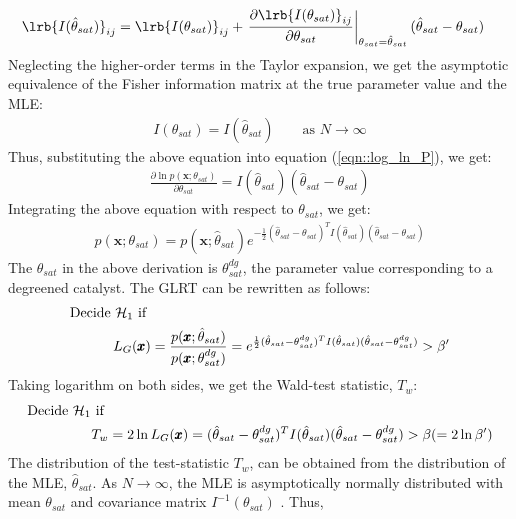 \begin{align}
        \lrb{I(\hat \theta_{sat})}_{ij} &=  \lrb{I(\theta_{sat})}_{ij} + \left. \frac{\partial \lrb{I(\theta_{sat})}_{ij}}{\partial \theta_{sat}} \right|_{\theta_{sat} = \hat \theta_{sat}} (\hat \theta_{sat} - \theta_{sat})
        \label{eqn::I_taylor}
\end{align}
Neglecting the higher-order terms in the Taylor expansion, we get the asymptotic equivalence of the Fisher information matrix at the true parameter value and the MLE:
\begin{align}
        I(\theta_{sat}) = I(\hat \theta_{sat}) \qquad \text{as } N \rightarrow \infty
        \label{eqn::I_asymp}
\end{align}
Thus, substituting the above equation into equation (\ref{eqn::log_ln_P}), we get:
\begin{align}
        \frac{\partial \ln p(\pmb x; \theta_{sat})}{\partial \theta_{sat}} = I(\hat \theta_{sat})(\hat \theta_{sat} - \theta_{sat})
        \label{eqn::log_ln_P_2}
\end{align}
Integrating the above equation with respect to $\theta_{sat}$, we get:
\begin{align}
        p(\pmb x; \theta_{sat}) = p(\pmb x; \hat \theta_{sat}) e^{-\frac{1}{2} (\hat \theta_{sat} - \theta_{sat})^T I(\hat \theta_{sat}) (\hat \theta_{sat} - \theta_{sat})}
        \label{eqn::p_x_theta}
\end{align}
The $\theta_{sat}$ in the above derivation is $\theta^{dg}_{sat}$, the parameter value corresponding to a degreened catalyst. The GLRT can be rewritten as follows:
\begin{align}
\text{Decide } \mathcal{H}_1 \text{ if } & \notag \\
        L_G (\pmb x) &= \frac{p(\pmb x; \hat \theta_{sat})}{p(\pmb x; \theta^{dg}_{sat})} = e^{\frac{1}{2} (\hat \theta_{sat} - \theta^{dg}_{sat})^T I(\hat \theta_{sat}) (\hat \theta_{sat} - \theta^{dg}_{sat})} > \beta'
\end{align}
Taking logarithm on both sides, we get the Wald-test \cite{wald1943tests} statistic, $T_w$:
\begin{align}
\text{Decide } \mathcal{H}_1 \text{ if } & \notag \\
        T_w &= 2 \ln L_G (\pmb x) = (\hat \theta_{sat} - \theta^{dg}_{sat})^T I(\hat \theta_{sat}) (\hat \theta_{sat} - \theta^{dg}_{sat}) > \beta (= 2 \ln \beta')
        \label{eqn::wald_statistic}
\end{align}
The distribution of the test-statistic $T_w$, can be obtained from the distribution of the MLE, $\hat \theta_{sat}$. As $N \rightarrow \infty$, the MLE is asymptotically normally distributed with mean $\theta_{sat}$ and covariance matrix $I^{-1}(\theta_{sat})$ \cite{kay1993estimation}. Thus,

